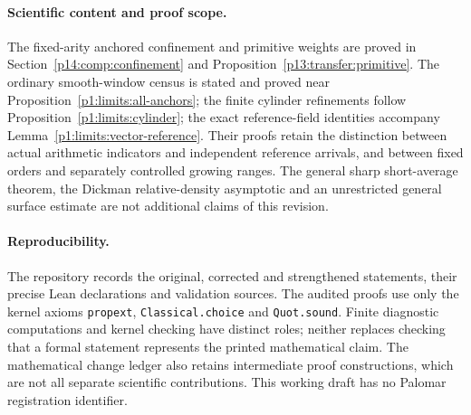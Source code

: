 \paragraph{Scientific content and proof scope.}
The fixed-arity anchored confinement and primitive weights are proved
in Section~\ref{p14:comp:confinement} and
Proposition~\ref{p13:transfer:primitive}. The ordinary smooth-window
census is stated and proved near Proposition~\ref{p1:limits:all-anchors};
the finite cylinder refinements follow
Proposition~\ref{p1:limits:cylinder}; the exact reference-field
identities accompany Lemma~\ref{p1:limits:vector-reference}.
Their proofs retain the distinction between actual arithmetic
indicators and independent reference arrivals, and between fixed
orders and separately controlled growing ranges. The general sharp
short-average theorem, the Dickman relative-density asymptotic and
an unrestricted general surface estimate are not additional claims
of this revision.

\paragraph{Reproducibility.}
The repository records the original, corrected and strengthened
statements, their precise Lean declarations and validation sources.
The audited proofs use only the kernel axioms
\texttt{propext}, \texttt{Classical.choice} and \texttt{Quot.sound}.
Finite diagnostic computations and kernel checking have distinct
roles; neither replaces checking that a formal statement represents
the printed mathematical claim. The mathematical change ledger
also retains intermediate proof constructions, which are not all
separate scientific contributions.
This working draft has no Palomar registration identifier.
